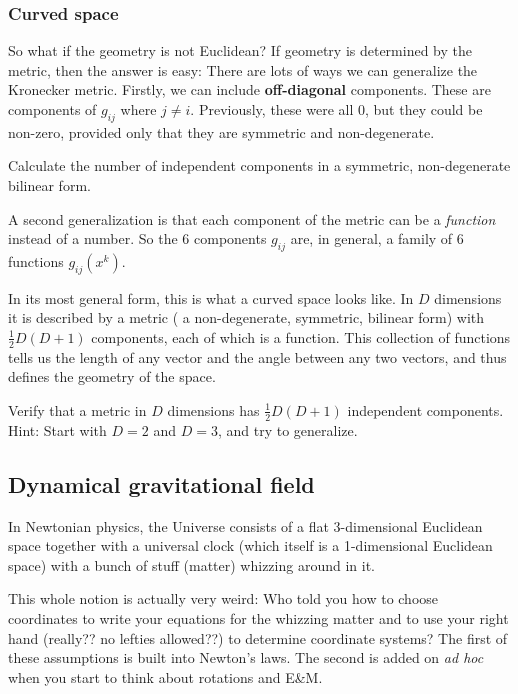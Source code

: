 \subsubsection{Curved space}
So what if the geometry is not Euclidean? If geometry is determined by the metric, then the answer is easy: There are lots of ways we can generalize the Kronecker metric. Firstly, we can include {\bf off-diagonal} components. These are components of $g_{ij}$ where $j≠i$. Previously, these were all $0$, but they could be non-zero, provided only that they are symmetric and non-degenerate. 
\begin{exercise}
Calculate the number of independent components in a symmetric, non-degenerate bilinear form.
\end{exercise}

A second generalization is that each component of the metric can be a {\em function} instead of a number. So the 6 components $g_{ij}$ are, in general, a family of 6 functions $g_{ij}(x^k)$. 

In its most general form, this is what a curved space looks like. In $D$ dimensions it is described by a metric (\ie{} a non-degenerate, symmetric, bilinear form) with $\frac12D(D+1)$ components, each of which is a function. This collection of functions tells us the length of any vector and the angle between any two vectors, and thus defines the geometry of the space. 
\begin{exercise}
Verify that a metric in $D$ dimensions has $\frac12D(D+1)$ independent components. Hint: Start with $D=2$ and $D=3$, and try to generalize.
\end{exercise}


\subsection{Dynamical gravitational field}
In Newtonian physics, the Universe consists of a flat 3-dimensional Euclidean space together with a universal clock (which itself is a 1-dimensional Euclidean space) with a bunch of stuff (matter) whizzing around in it. 

This whole notion is actually very weird: Who told you how to choose coordinates to write your equations for the whizzing matter and to use your right hand (really?? no lefties allowed??) to determine coordinate systems? The first of these assumptions is built into Newton's laws. The second is added on {\it ad hoc} when you start to think about rotations and E\&M. 

